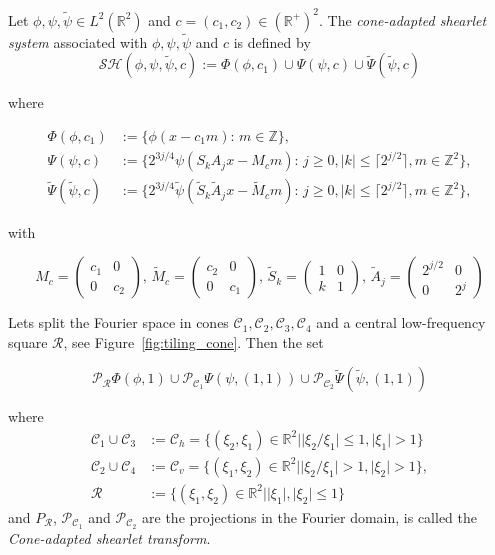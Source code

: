 \bigskip

\begin{defn}
\label{def:cone_shearlets}
Let $\phi,\psi,\tilde{\psi}\in L^2(\mathbb{R}^2)$ and $c=(c_1,c_2)\in (\mathbb{R}^+)^2$. The \textit{cone-adapted shearlet system} associated with $\phi,\psi,\tilde{\psi}$ and $c$ is defined by 
$$
\mathcal{SH}(\phi,\psi,\tilde{\psi},c):=\Phi(\phi,c_1)\cup\Psi(\psi,c)\cup \tilde{\Psi}(\tilde{\psi},c)
$$

where

$$
\begin{aligned}
\Phi(\phi,c_1)&:=\{\phi(x-c_1m)\text{: }m\in\mathbb{Z}\},\\
\Psi(\psi,c)&:=\{2^{3j/4}\psi(S_kA_jx-M_cm)\text{: } j\geq 0,|k|\leq\lceil 2^{j/2}\rceil,m\in\mathbb{Z}^2\},\\
\tilde{\Psi}(\tilde{\psi},c)&:=\{2^{3j/4}\tilde{\psi}(\tilde{S}_k\tilde{A}_jx-\tilde{M}_cm)\text{: } j \geq 0,|k|\leq\lceil 2^{j/2}\rceil,m\in\mathbb{Z}^2\},
\end{aligned}
$$

with 

$$
M_c=\left(\begin{matrix} c_1 & 0 \\ 0 & c_2\end{matrix}\right)\text{,  }
\tilde{M}_c=\left(\begin{matrix} c_2 & 0 \\ 0 & c_1\end{matrix}\right) \text{,  }
\tilde{S}_k=\left(\begin{matrix} 1 & 0 \\ k & 1 \end{matrix}\right)\text{,  }
\tilde{A}_j=\left(\begin{matrix} 2^{j/2} & 0 \\ 0 & 2^j\end{matrix}\right)
$$

Lets split the Fourier space in cones $\mathcal{C}_1, \mathcal{C}_2, \mathcal{C}_3,\mathcal{C}_4$ and a central low-frequency square $\mathcal{R}$, see Figure~\ref{fig:tiling_cone}. Then the set

$$
\mathcal{P}_{\mathcal{R}}\Phi(\phi,1)\cup \mathcal{P}_{\mathcal{C}_1}\Psi(\psi,(1,1))\cup\mathcal{P}_{\mathcal{C}_2}\tilde{\Psi}(\tilde{\psi},(1,1))
$$

where 
$$
\begin{aligned}
\mathcal{C}_1\cup \mathcal{C}_3 &:=\mathcal{C}_h =\{ (\xi_2,\xi_1)\in\mathbb{R}^2| |\xi_2/\xi_1|\leq 1,|\xi_1|>1\}\\
\mathcal{C}_2\cup \mathcal{C}_4 &:= \mathcal{C}_v =\{ (\xi_1,\xi_2)\in\mathbb{R}^2||\xi_2/\xi_1|> 1, |\xi_2|>1\},\\
\mathcal{R}&:=\{ (\xi_1,\xi_2)\in\mathbb{R}^2||\xi_1|,|\xi_2|\leq 1\}
\end{aligned}
$$
and $P_{\mathcal{R}}$, $\mathcal{P}_{\mathcal{C}_1}$ and $\mathcal{P}_{\mathcal{C}_2}$ are the projections in the Fourier domain, is called the \textit{Cone-adapted shearlet transform}.
\end{defn}

